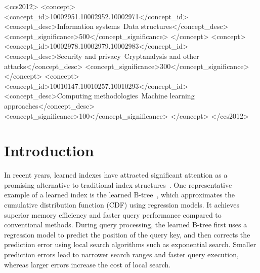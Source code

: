 \documentclass[acmsmall]{acmart}
\begin{document}
\begin{CCSXML}
<ccs2012>
    <concept>
        <concept_id>10002951.10002952.10002971</concept_id>
        <concept_desc>Information systems~Data structures</concept_desc>
        <concept_significance>500</concept_significance>
        </concept>
    <concept>
        <concept_id>10002978.10002979.10002983</concept_id>
        <concept_desc>Security and privacy~Cryptanalysis and other attacks</concept_desc>
        <concept_significance>300</concept_significance>
        </concept>
    <concept>
        <concept_id>10010147.10010257.10010293</concept_id>
        <concept_desc>Computing methodologies~Machine learning approaches</concept_desc>
        <concept_significance>100</concept_significance>
        </concept>
</ccs2012>
\end{CCSXML}




\maketitle



\section{Introduction}
\label{sec:introduction}



In recent years, learned indexes have attracted significant attention as a promising alternative to traditional index structures~\cite{kraska2018case_li,sosd-vldb,ferragina2020pgm,vaidya2020partitioned,hsu2019learning,yang2020leaper}.
One representative example of a learned index is the learned B-tree~\cite{kraska2018case_li,ferragina2020pgm,sun2023learned}, which approximates the cumulative distribution function (CDF) using regression models. It achieves superior memory efficiency and faster query performance compared to conventional methods.
During query processing, the learned B-tree first uses a regression model to predict the position of the query key, and then corrects the prediction error using local search algorithms such as exponential search.
Smaller prediction errors lead to narrower search ranges and faster query execution, whereas larger errors increase the cost of local search.
\end{document}
